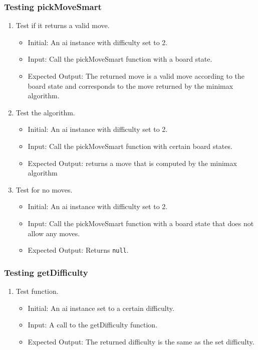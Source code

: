 \documentclass[12pt, titlepage]{article}
\begin{document}
\subsubsection {Testing pickMoveSmart}
\begin{enumerate}
	\item Test if it returns a valid move. \begin{itemize}
		      \item Initial: An ai instance with difficulty set to 2.
		      \item Input: Call the pickMoveSmart function with a board state.
		      \item Expected Output: The returned move is a valid move according to the board state and corresponds to the move returned by the minimax algorithm.
	      \end{itemize}
	\item Test the algorithm. \begin{itemize}
		      \item Initial: An ai instance with difficulty set to 2.
		      \item Input: Call the pickMoveSmart function with certain board states.
		      \item Expected Output: returns a move that is computed by the minimax algorithm
	      \end{itemize}
	\item Test for no moves. \begin{itemize}
		      \item Initial: An ai instance with difficulty set to 2.
		      \item Input: Call the pickMoveSmart function with a board state that does not allow any moves.
		      \item Expected Output: Returns \texttt{null}.
	      \end{itemize}
\end{enumerate}

\subsubsection {Testing getDifficulty}
\begin{enumerate}
	\item Test function. \begin{itemize}
		      \item Initial: An ai instance set to a certain difficulty.
		      \item Input: A call to the getDifficulty function.
		      \item Expected Output: The returned difficulty is the same as the set difficulty.
	      \end{itemize}
\end{enumerate}
\end{document}
